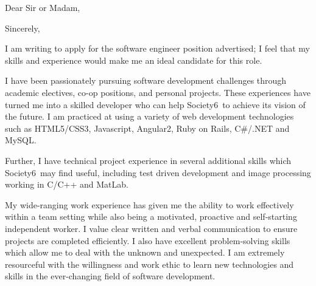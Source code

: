 \documentclass[11pt,a4paper,sans]{moderncv}        %
\begin{document}
\nocite{*}


\newcommand{\company}{Society6}
\clearpage
\recipient{\company}{}
\date{April 17, 2017}
\opening{Dear Sir or Madam,}
\closing{Sincerely,}
\makelettertitle

I am writing to apply for the software engineer position advertised; I feel that my skills and experience would make me an ideal candidate for this role.

I have been passionately pursuing software development challenges through academic electives, co-op positions, and personal projects. 
These experiences have turned me into a skilled developer who can help \company~to achieve its vision of the future. 
I am practiced at using a variety of web development technologies such as HTML5/CSS3, Javascript, Angular2, Ruby on Rails, C\#/.NET and MySQL.

Further, I have technical project experience in several additional skills which \company~may find useful, including test driven development and image processing working in C/C++ and MatLab. 

My wide-ranging work experience has given me the ability to work effectively within a team setting while also being a motivated, proactive and self-starting independent worker. 
I value clear written and verbal communication to ensure projects are completed efficiently. 
I also have excellent problem-solving skills which allow me to deal with the unknown and unexpected. 
I am extremely resourceful with the willingness and work ethic to learn new technologies and skills in the ever-changing field of software development.
\end{document}
